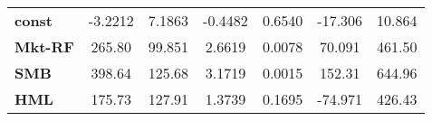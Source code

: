 \begin{center}
\begin{tabular}{lcccccc}
\midrule
\textbf{const}  &      -3.2212       &       7.1863       &     -0.4482     &      0.6540      &      -17.306      &       10.864       \\
\textbf{Mkt-RF} &       265.80       &       99.851       &      2.6619     &      0.0078      &       70.091      &       461.50       \\
\textbf{SMB}    &       398.64       &       125.68       &      3.1719     &      0.0015      &       152.31      &       644.96       \\
\textbf{HML}    &       175.73       &       127.91       &      1.3739     &      0.1695      &      -74.971      &       426.43       \\
\bottomrule
\end{tabular}
\end{center}
